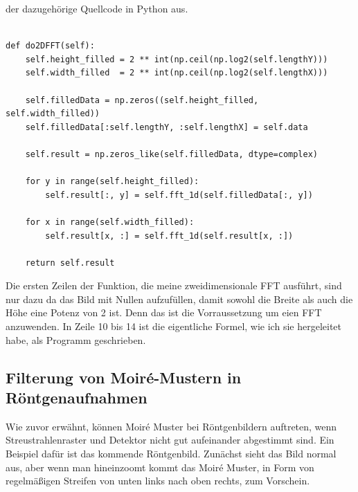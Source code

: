 \documentclass[a4paper,12pt]{article}
\theoremstyle{definition}
\theoremstyle{remark}
\begin{document}
der dazugehörige Quellcode in Python aus.
\\\\
\begin{lstlisting}[style=pythonstyle]
def do2DFFT(self):
    self.height_filled = 2 ** int(np.ceil(np.log2(self.lengthY)))
    self.width_filled  = 2 ** int(np.ceil(np.log2(self.lengthX)))

    self.filledData = np.zeros((self.height_filled, self.width_filled))
    self.filledData[:self.lengthY, :self.lengthX] = self.data

    self.result = np.zeros_like(self.filledData, dtype=complex)

    for y in range(self.height_filled):
        self.result[:, y] = self.fft_1d(self.filledData[:, y])
    
    for x in range(self.width_filled):
        self.result[x, :] = self.fft_1d(self.result[x, :])

    return self.result
\end{lstlisting}

Die ersten Zeilen der Funktion, die meine zweidimensionale FFT ausführt, sind nur dazu da das Bild mit Nullen aufzufüllen, damit sowohl 
die Breite als auch die Höhe eine Potenz von 2 ist. Denn das ist die Vorraussetzung um eien FFT anzuwenden. In Zeile 10 bis 14 ist die eigentliche Formel, wie ich sie 
hergeleitet habe, als Programm geschrieben.  

\subsection{Filterung von Moiré-Mustern in Röntgenaufnahmen}
Wie zuvor erwähnt, können Moiré Muster bei Röntgenbildern auftreten, wenn Streustrahlenraster und Detektor nicht gut aufeinander abgestimmt sind. Ein Beispiel 
dafür ist das kommende Röntgenbild. Zunächst sieht das Bild normal aus, aber wenn man hineinzoomt kommt das Moiré Muster, in Form von regelmäßigen Streifen von 
unten links nach oben rechts, zum Vorschein. 
\end{document}
